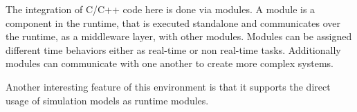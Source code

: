 The integration of C/C++ code here is done via modules.
A module is a component in the runtime, that is executed standalone and communicates over the runtime, as a middleware layer, with other modules.
Modules can be assigned different time behaviors either as real-time or non real-time tasks.
Additionally modules can communicate with one another to create more complex systems.

Another interesting feature of this environment is that it supports the direct usage of simulation models as runtime modules.

